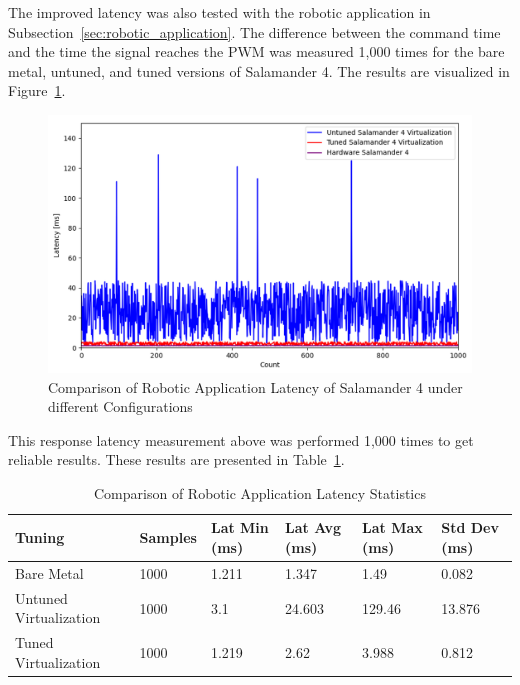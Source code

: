 \documentclass[MMR,Master,english]{style/twbook}
\begin{document}
\clearpage

\noindent The improved latency was also tested with the robotic application in Subsection~\ref{sec:robotic_application}. The difference between the command time and the time the signal reaches the PWM was measured 1,000 times for the bare metal, untuned, and tuned versions of Salamander 4. The results are visualized in Figure~\ref{fig:combined_latencies}.

\begin{figure}[H]
	\centering
	\includegraphics[width=1.0\columnwidth]{img/results/combined_latencies.png}
	\caption[Comparison of Robotic Application Latency of Salamander 4 Configurations]{Comparison of Robotic Application Latency of Salamander 4 under different Configurations}
	\label{fig:combined_latencies}
\end{figure}

\noindent This response latency measurement above was performed 1,000 times to get reliable results. These results are presented in Table~\ref{tab:robotic_application_latency_values_combined}.

\begin{table}[H]
	\small
	\centering
	\caption{Comparison of Robotic Application Latency Statistics}
	\label{tab:robotic_application_latency_values_combined}
	\setlength{\tabcolsep}{0.5em} %
	{\renewcommand{\arraystretch}{1.2}%
		\begin{tabular}{|l|l|l|l|l|l|}
			\hline
			\textbf{Tuning}        & \textbf{Samples} & \textbf{Lat Min (ms)} & \textbf{Lat Avg (ms)} & \textbf{Lat Max (ms)} & \textbf{Std Dev (ms)} \\ \hline
			Bare Metal             & 1000             & 1.211                 & 1.347                 & 1.49                  & 0.082                 \\ \hline
			Untuned Virtualization & 1000             & 3.1                   & 24.603                & 129.46                & 13.876                \\ \hline
			Tuned Virtualization   & 1000             & 1.219                 & 2.62                  & 3.988                 & 0.812                 \\ \hline
		\end{tabular}}
\end{table}
\end{document}
